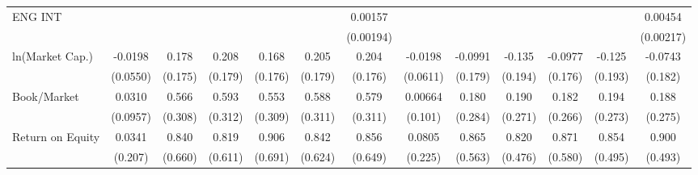 {\begin{tabular}{l*{12}{c}}
ENG INT             &                     &                     &                     &                     &                     &     0.00157         &                     &                     &                     &                     &                     &     0.00454\sym{**} \\
                    &                     &                     &                     &                     &                     &   (0.00194)         &                     &                     &                     &                     &                     &   (0.00217)         \\
ln(Market Cap.)     &     -0.0198         &       0.178         &       0.208         &       0.168         &       0.205         &       0.204         &     -0.0198         &     -0.0991         &      -0.135         &     -0.0977         &      -0.125         &     -0.0743         \\
                    &    (0.0550)         &     (0.175)         &     (0.179)         &     (0.176)         &     (0.179)         &     (0.176)         &    (0.0611)         &     (0.179)         &     (0.194)         &     (0.176)         &     (0.193)         &     (0.182)         \\
Book/Market         &      0.0310         &       0.566\sym{*}  &       0.593\sym{*}  &       0.553\sym{*}  &       0.588\sym{*}  &       0.579\sym{*}  &     0.00664         &       0.180         &       0.190         &       0.182         &       0.194         &       0.188         \\
                    &    (0.0957)         &     (0.308)         &     (0.312)         &     (0.309)         &     (0.311)         &     (0.311)         &     (0.101)         &     (0.284)         &     (0.271)         &     (0.266)         &     (0.273)         &     (0.275)         \\
Return on Equity    &      0.0341         &       0.840         &       0.819         &       0.906         &       0.842         &       0.856         &      0.0805         &       0.865         &       0.820\sym{*}  &       0.871         &       0.854\sym{*}  &       0.900\sym{*}  \\
                    &     (0.207)         &     (0.660)         &     (0.611)         &     (0.691)         &     (0.624)         &     (0.649)         &     (0.225)         &     (0.563)         &     (0.476)         &     (0.580)         &     (0.495)         &     (0.493)         \\

\end{tabular}}
